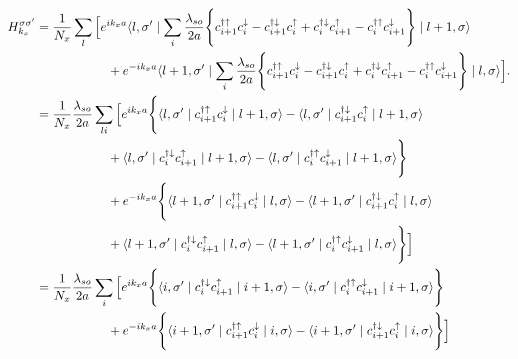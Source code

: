 \documentclass[10pt,prb,showpacs,amssymb,floatfix]{revtex4-1}
\newcommand{\nn}{\nonumber}
\begin{document}
\begin{align}
H_{k_x}^{\sigma \sigma'} &= \frac{1}{N_x}\sum_{l} \Big{[} e^{i k_x a} \langle l,\sigma' \mid  \sum_{i} \frac{\lambda_{so}}{2a}  \Bigg{\{}  c_{i+1}^{\dagger \uparrow} c_{i}^\downarrow -  c_{i+1}^{\dagger \downarrow} c_{i}^\uparrow  + c_{i}^{\dagger \downarrow} c_{i+1}^\uparrow - c_{i}^{\dagger \uparrow} c_{i+1}^\downarrow\Bigg{\}} \mid l+1,\sigma\rangle \nn\\ 
& ~~~~~~~~~~~~~~~~~  + e^{-i k_x a} \langle l+1,\sigma' \mid  \sum_{i} \frac{\lambda_{so}}{2a}  \Bigg{\{}  c_{i+1}^{\dagger \uparrow} c_{i}^\downarrow -  c_{i+1}^{\dagger \downarrow} c_{i}^\uparrow  + c_{i}^{\dagger \downarrow} c_{i+1}^\uparrow - c_{i}^{\dagger \uparrow} c_{i+1}^\downarrow\Bigg{\}} \mid l,\sigma\rangle \Big{]}. \\
&= \frac{1}{N_x} \frac{\lambda_{so}}{2a}\sum_{li} \Big{[} e^{i k_x a} \Bigg{\{}  \langle l,\sigma' \mid c_{i+1}^{\dagger \uparrow} c_{i}^\downarrow \mid l+1,\sigma\rangle -  \langle l,\sigma' \mid c_{i+1}^{\dagger \downarrow} c_{i}^\uparrow \mid l+1,\sigma\rangle \nn\\& ~~~~~~~~~~~~~~~~~  + \langle l,\sigma' \mid c_{i}^{\dagger \downarrow} c_{i+1}^\uparrow \mid l+1,\sigma\rangle - \langle l,\sigma' \mid c_{i}^{\dagger \uparrow} c_{i+1}^\downarrow \mid l+1,\sigma\rangle \Bigg{\}}  \nn\\ 
& ~~~~~~~~~~~~~~~~~  + e^{-i k_x a}  \Bigg{\{}  \langle l+1,\sigma' \mid    c_{i+1}^{\dagger \uparrow} c_{i}^\downarrow \mid l,\sigma\rangle - \langle l+1,\sigma' \mid    c_{i+1}^{\dagger \downarrow} c_{i}^\uparrow \mid l,\sigma\rangle  \nn\\& ~~~~~~~~~~~~~~~~~ + \langle l+1,\sigma' \mid    c_{i}^{\dagger \downarrow} c_{i+1}^\uparrow \mid l,\sigma\rangle  - \langle l+1,\sigma' \mid   c_{i}^{\dagger \uparrow} c_{i+1}^\downarrow \mid l,\sigma\rangle \Bigg{\}}  \Big{]} \\
&= \frac{1}{N_x} \frac{\lambda_{so}}{2a}\sum_{i} \Big{[} e^{i k_x a} \Bigg{\{}   \langle i,\sigma' \mid c_{i}^{\dagger \downarrow} c_{i+1}^\uparrow \mid i+1,\sigma\rangle - \langle i,\sigma' \mid c_{i}^{\dagger \uparrow} c_{i+1}^\downarrow \mid i+1,\sigma\rangle \Bigg{\}}   \nn\\& ~~~~~~~~~~~~~~~~~ + e^{-i k_x a}  \Bigg{\{}  \langle i+1,\sigma' \mid    c_{i+1}^{\dagger \uparrow} c_{i}^\downarrow \mid i,\sigma\rangle - \langle i+1,\sigma' \mid    c_{i+1}^{\dagger \downarrow} c_{i}^\uparrow \mid i,\sigma\rangle \Bigg{\}}  \Big{]}  
\label{hsox5}
\end{align}
\end{document}
